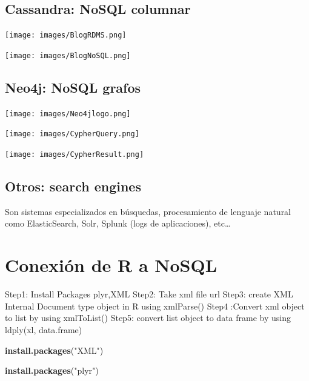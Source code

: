 \documentclass[]{book}
\newenvironment{Shaded}{\begin{snugshade}}{\end{snugshade}}
\newcommand{\KeywordTok}[1]{\textcolor[rgb]{0.13,0.29,0.53}{\textbf{#1}}}
\newcommand{\NormalTok}[1]{#1}
\newcommand{\StringTok}[1]{\textcolor[rgb]{0.31,0.60,0.02}{#1}}
\begin{document}
\hypertarget{cassandra-nosql-columnar}{%
\subsection{Cassandra: NoSQL columnar}\label{cassandra-nosql-columnar}}

\texttt{[image: images/BlogRDMS.png]}

\texttt{[image: images/BlogNoSQL.png]}

\hypertarget{neo4j-nosql-grafos}{%
\subsection{Neo4j: NoSQL grafos}\label{neo4j-nosql-grafos}}

\texttt{[image: images/Neo4jlogo.png]}

\texttt{[image: images/CypherQuery.png]}

\texttt{[image: images/CypherResult.png]}

\hypertarget{otros-search-engines}{%
\subsection{Otros: search engines}\label{otros-search-engines}}

Son sistemas especializados en búsquedas, procesamiento de lenguaje natural como ElasticSearch, Solr, Splunk (logs de aplicaciones), etc\ldots{}

\hypertarget{conexion-de-r-a-nosql}{%
\section{Conexión de R a NoSQL}\label{conexion-de-r-a-nosql}}

Step1: Install Packages plyr,XML
Step2: Take xml file url
Step3: create XML Internal Document type object in R using xmlParse()
Step4 :Convert xml object to list by using xmlToList()
Step5: convert list object to data frame by using ldply(xl, data.frame)

\begin{Shaded}
\begin{Highlighting}[]
\KeywordTok{install.packages}\NormalTok{(}\StringTok{"XML"}\NormalTok{)}
\end{Highlighting}
\end{Shaded}

\begin{Shaded}
\begin{Highlighting}[]
\KeywordTok{install.packages}\NormalTok{(}\StringTok{"plyr"}\NormalTok{)}
\end{Highlighting}
\end{Shaded}
\end{document}
